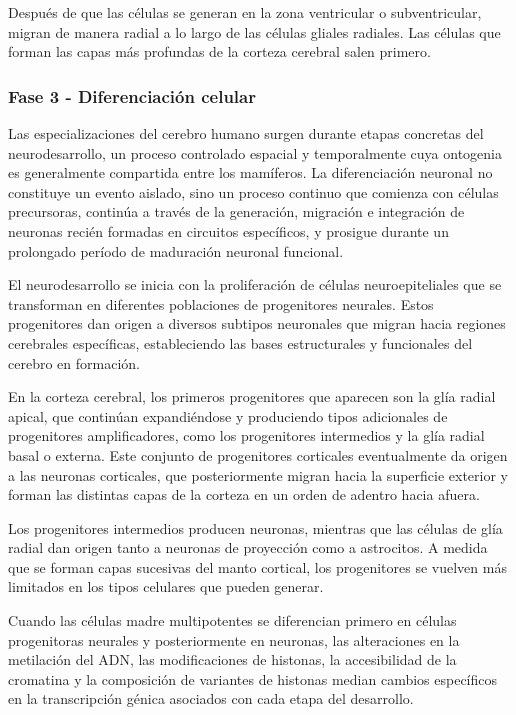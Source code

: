 \documentclass[11pt,letterpaper]{report}
\begin{document}
Después de que las células se generan en la zona ventricular o subventricular,
migran de manera radial a lo largo de las células gliales radiales. Las células
que forman las capas más profundas de la corteza cerebral salen primero. 
\cite{Polin124}

\subsubsection{Fase 3 - Diferenciación celular}
Las especializaciones del cerebro humano surgen durante etapas concretas del
neurodesarrollo, un proceso controlado espacial y temporalmente cuya
ontogenia es generalmente compartida entre los mamíferos. La diferenciación
neuronal no constituye un evento aislado, sino un proceso continuo que comienza
con células precursoras, continúa a través de la generación, migración e
integración de neuronas recién formadas en circuitos específicos, y prosigue
durante un prolongado período de maduración neuronal funcional.
\cite{Lindhout2024}

El neurodesarrollo se inicia con la proliferación de células neuroepiteliales
que se transforman en diferentes poblaciones de progenitores neurales. Estos
progenitores dan origen a diversos subtipos neuronales que migran hacia
regiones cerebrales específicas, estableciendo las bases estructurales y
funcionales del cerebro en formación. \cite{Lindhout2024}

En la corteza cerebral, los primeros progenitores que aparecen son la glía
radial apical, que continúan expandiéndose y produciendo tipos adicionales de
progenitores amplificadores, como los progenitores intermedios y la glía radial
basal o externa. Este conjunto de progenitores corticales eventualmente da
origen a las neuronas corticales, que posteriormente migran hacia la superficie
exterior y forman las distintas capas de la corteza en un orden de adentro
hacia afuera. \cite{Lindhout2024}

Los progenitores intermedios producen neuronas, mientras que las células de
glía radial dan origen tanto a neuronas de proyección como a astrocitos. A
medida que se forman capas sucesivas del manto cortical, los progenitores se
vuelven más limitados en los tipos celulares que pueden generar.
\cite{Lindhout2024}

Cuando las células madre multipotentes se diferencian primero en células
progenitoras neurales y posteriormente en neuronas, las alteraciones en la
metilación del ADN, las modificaciones de histonas, la accesibilidad de la
cromatina y la composición de variantes de histonas median cambios específicos
en la transcripción génica asociados con cada etapa del desarrollo.
\cite{Lindhout2024}
\end{document}
